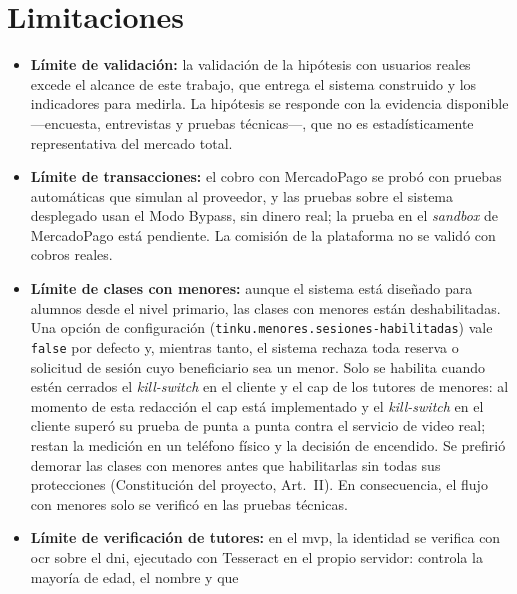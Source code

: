\section{Limitaciones}\label{sec:limitaciones}

\begin{itemize}
    \item \textbf{Límite de validación:} la validación de la hipótesis con
          usuarios reales excede el alcance de este trabajo, que entrega el
          sistema construido y los indicadores para medirla. La hipótesis
          se responde con la evidencia disponible ---encuesta, entrevistas
          y pruebas técnicas---, que no es estadísticamente representativa
          del mercado total.
    \item \textbf{Límite de transacciones:} el cobro con MercadoPago se
          probó con pruebas automáticas que simulan al proveedor, y las
          pruebas sobre el sistema desplegado usan el Modo Bypass, sin
          dinero real; la prueba en el \emph{sandbox} de MercadoPago está
          pendiente. La comisión de la plataforma no se validó con cobros
          reales.
    \item \textbf{Límite de clases con menores:} aunque el sistema está
          diseñado para alumnos desde el nivel primario, las clases con
          menores están deshabilitadas. Una opción de configuración
          (\texttt{tinku.menores.sesiones-habilitadas}) vale
          \texttt{false} por defecto y, mientras tanto, el sistema rechaza
          toda reserva o solicitud de sesión cuyo beneficiario sea un
          menor. Solo se habilita cuando estén cerrados el
          \emph{kill-switch} en el cliente y el \gls{cap} de los tutores
          de menores: al momento de esta redacción el \gls{cap} está
          implementado y el \emph{kill-switch} en el cliente superó su
          prueba de punta a punta contra el servicio de video real; restan
          la medición en un teléfono físico y la decisión de encendido. Se prefirió demorar las
          clases con menores antes que habilitarlas sin todas sus
          protecciones (Constitución del proyecto, Art.~II). En
          consecuencia, el flujo con menores solo se verificó en las
          pruebas técnicas.
    \item \textbf{Límite de verificación de tutores:} en el \gls{mvp}, la
          identidad se verifica con \gls{ocr} sobre el \gls{dni}, ejecutado con Tesseract en el
          propio servidor: controla la mayoría de edad, el nombre y que

\end{itemize}
